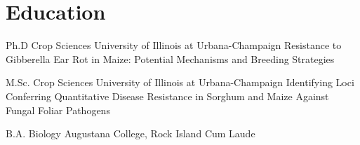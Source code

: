 \section*{Education}

    {Ph.D Crop Sciences}
    {University of Illinois at Urbana-Champaign}
    {Resistance to Gibberella Ear Rot in Maize: Potential Mechanisms and Breeding Strategies}

    {M.Sc. Crop Sciences}
    {University of Illinois at Urbana-Champaign}
    {Identifying Loci Conferring Quantitative Disease Resistance in Sorghum and Maize Against Fungal Foliar Pathogens}

    {B.A. Biology}
    {Augustana College, Rock Island}
    {Cum Laude}